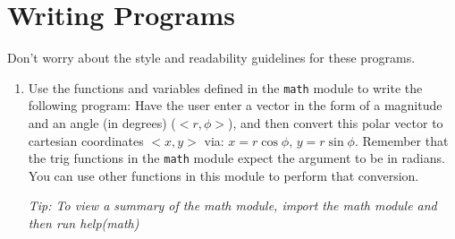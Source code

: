 \documentclass{article}
\begin{document}
\section*{Writing Programs}
Don't worry about the style and readability guidelines for these programs.
\begin{enumerate}
	\item Use the functions and variables defined in the \texttt{math} module to write the following program: Have the user enter a vector in the form of a magnitude and an angle (in degrees) ($<r,\phi>$), and then convert this polar vector to cartesian coordinates $<x,y>$ via: $x=r\cos\phi$, $y=r\sin{\phi}$. Remember that the trig functions in the \texttt{math} module expect the argument to be in radians. You can use other functions in this module to perform that conversion.
	
	\textit{Tip: To view a summary of the math module, import the math module and then run help(math)}
	

\end{enumerate}
\end{document}
